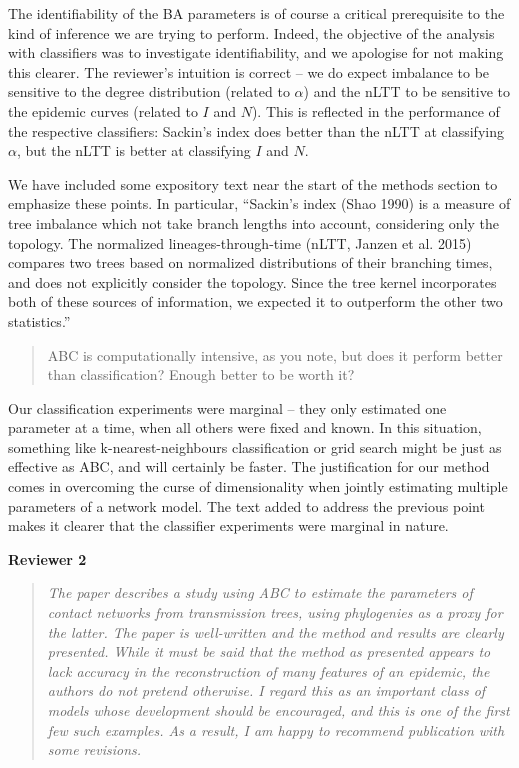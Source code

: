 \documentclass[12pt]{letter}
\begin{document}
\begin{letter}{ }
The identifiability of the BA parameters is of course a critical prerequisite
to the kind of inference we are trying to perform. Indeed, the objective of the 
analysis with classifiers was to investigate identifiability, and we apologise
for not making this clearer. The reviewer's intuition is correct -- we do
expect imbalance to be sensitive to the degree distribution (related to
$\alpha$) and the nLTT to be sensitive to the epidemic curves (related to $I$
and $N$). This is reflected in the performance of the respective classifiers:
Sackin's index does better than the nLTT at classifying $\alpha$, but the nLTT
is better at classifying $I$ and $N$.

We have included some expository text near the start of the methods section to
emphasize these points. In particular, ``Sackin's index (Shao 1990)
is a measure of tree imbalance which not take branch lengths into account,
considering only the topology. The normalized lineages-through-time (nLTT,
Janzen et al. 2015) compares two trees based on normalized distributions of
their branching times, and does not explicitly consider the topology. Since the
tree kernel incorporates both of these sources of information, we expected it
to outperform the other two statistics.''

\begin{quote}
  \itshape

  ABC is computationally intensive, as you note, but does it perform better
  than classification? Enough better to be worth it?
\end{quote}

Our classification experiments were marginal -- they only estimated one
parameter at a time, when all others were fixed and known. In this situation,
something like k-nearest-neighbours classification or grid search might be just
as effective as ABC, and will certainly be faster. The justification for our
method comes in overcoming the curse of dimensionality when jointly estimating
multiple parameters of a network model. The text added to address the previous
point makes it clearer that the classifier experiments were marginal in nature.

\textbf{Reviewer 2}

\begin{quote}
  \itshape
  The paper describes a study using ABC to estimate the parameters of contact
  networks from transmission trees, using phylogenies as a proxy for the
  latter. The paper is well-written and the method and results are clearly
  presented. While it must be said that the method as presented appears to lack
  accuracy in the reconstruction of many features of an epidemic, the authors
  do not pretend otherwise. I regard this as an important class of models whose
  development should be encouraged, and this is one of the first few such
  examples. As a result, I am happy to recommend publication with some
  revisions. \\


\end{quote}
\end{letter}
\end{document}

